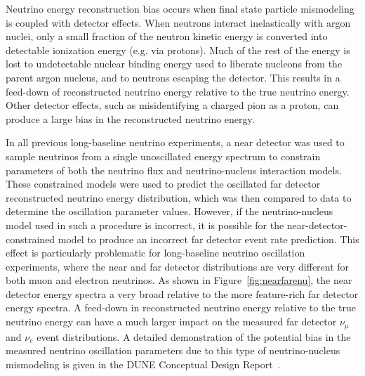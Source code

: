 Neutrino energy reconstruction bias occurs when final state particle mismodeling is coupled with detector effects. When neutrons interact inelastically with argon nuclei, only a small fraction of the neutron kinetic energy is converted into detectable ionization energy (e.g. via protons). Much of the rest of the energy is lost to undetectable nuclear binding energy used to liberate nucleons from the parent argon nucleus, and to neutrons escaping the detector. This results in a feed-down of reconstructed neutrino energy relative to the true neutrino energy. Other detector effects, such as misidentifying a charged pion as a proton, can produce a large bias in the reconstructed neutrino energy.

In all previous long-baseline neutrino experiments, a near detector was used to sample neutrinos from a single unoscillated energy spectrum to constrain parameters of both the neutrino flux and neutrino-nucleus interaction models. These constrained models were used to predict the oscillated far detector reconstructed neutrino energy distribution, which was then compared to data to determine the oscillation parameter values. However, if the neutrino-nucleus model used in such a procedure is incorrect, it is possible for the near-detector-constrained model to produce an incorrect far detector event rate prediction. This effect is particularly problematic for long-baseline neutrino oscillation experiments, where the near and far detector distributions are very different for both muon and electron neutrinos. As shown in Figure~\ref{fig:nearfarenu}, the near detector energy spectra a very broad relative to the more feature-rich far detector energy spectra. A feed-down in reconstructed neutrino energy relative to the true neutrino energy can have a much larger impact on the measured far detector $\nu_\mu$ and $\nu_e$ event distributions. A detailed demonstration of the potential bias in the measured neutrino oscillation parameters due to this type of neutrino-nucleus mismodeling is given in the DUNE Conceptual Design Report~\cite{DUNECDR}.

